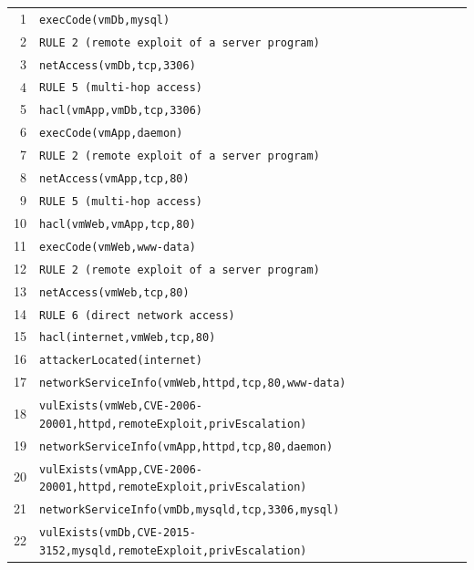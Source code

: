 \footnotesize
\begin{tabular}{rl}
1 & \texttt{execCode(vmDb,mysql)} \\
2 & \texttt{RULE 2 (remote exploit of a server program)} \\
3 & \texttt{netAccess(vmDb,tcp,3306)} \\
4 & \texttt{RULE 5 (multi-hop access)} \\
5 & \texttt{hacl(vmApp,vmDb,tcp,3306)} \\
6 & \texttt{execCode(vmApp,daemon)} \\
7 & \texttt{RULE 2 (remote exploit of a server program)} \\
8 & \texttt{netAccess(vmApp,tcp,80)} \\
9 & \texttt{RULE 5 (multi-hop access)} \\
10 & \texttt{hacl(vmWeb,vmApp,tcp,80)} \\
11 & \texttt{execCode(vmWeb,www-data)} \\
12 & \texttt{RULE 2 (remote exploit of a server program)} \\
13 & \texttt{netAccess(vmWeb,tcp,80)} \\
14 & \texttt{RULE 6 (direct network access)} \\
15 & \texttt{hacl(internet,vmWeb,tcp,80)} \\
16 & \texttt{attackerLocated(internet)} \\
17 & \texttt{networkServiceInfo(vmWeb,httpd,tcp,80,www-data)} \\
18 & \texttt{vulExists(vmWeb,CVE-2006-20001,httpd,remoteExploit,privEscalation)} \\
19 & \texttt{networkServiceInfo(vmApp,httpd,tcp,80,daemon)} \\
20 & \texttt{vulExists(vmApp,CVE-2006-20001,httpd,remoteExploit,privEscalation)} \\
21 & \texttt{networkServiceInfo(vmDb,mysqld,tcp,3306,mysql)} \\
22 & \texttt{vulExists(vmDb,CVE-2015-3152,mysqld,remoteExploit,privEscalation)} \\
\end{tabular}